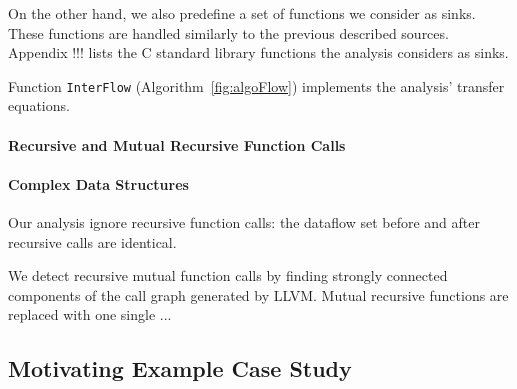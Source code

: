 On the other hand, we also predefine a set of functions
we consider as sinks. These functions are handled similarly
to the previous described sources. Appendix !!! lists
the C standard library functions the analysis considers
as sinks.

Function \texttt{InterFlow} (Algorithm~\ref{fig:algoFlow})
implements the analysis' transfer equations.

\paragraph{Recursive and Mutual Recursive Function Calls} 

\paragraph{Complex Data Structures}

Our analysis ignore recursive function calls: the dataflow set
before and after recursive calls are identical. 

We detect recursive mutual function calls by finding strongly
connected components of the call graph generated by LLVM.
Mutual recursive functions are replaced with one single ...


\subsection{Motivating Example Case Study}\label{sec:sampleSummary}


